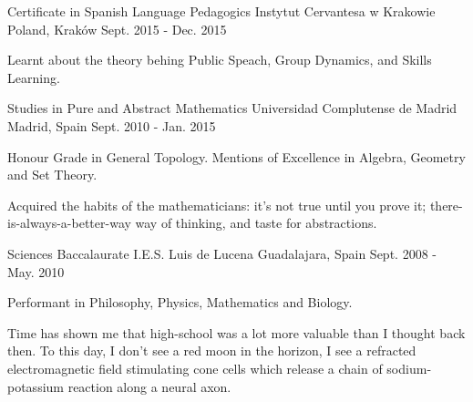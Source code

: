 

\begin{cventries}

  \cventry
    {Certificate in Spanish Language Pedagogics} %
    {Instytut Cervantesa w Krakowie} %
    {Poland, Kraków} %
    {Sept. 2015 - Dec. 2015} %
    {
      \begin{cvitems} %
        \item {Learnt about the theory behing Public Speach, Group Dynamics, and Skills Learning.}
      \end{cvitems}
    }

\cventry
	{Studies in Pure and Abstract Mathematics} %
	{Universidad Complutense de Madrid} %
	{Madrid, Spain} %
	{Sept. 2010 - Jan. 2015} %
	{
		\begin{cvitems} %
			\item {Honour Grade in General Topology. Mentions of Excellence in Algebra, Geometry and Set Theory.}
			\item {Acquired the habits of the mathematicians: it's not true until you prove it; there-is-always-a-better-way way of thinking, and taste for abstractions.}
		\end{cvitems}
	}

\cventry
	{Sciences Baccalaurate} %
	{I.E.S. Luis de Lucena} %
	{Guadalajara, Spain} %
	{Sept. 2008 - May. 2010} %
	{
		\begin{cvitems} %
			\item {Performant in Philosophy, Physics, Mathematics and Biology.}
			\item {Time has shown me that high-school was a lot more valuable than I thought back then. To this day, I don't see a red moon in the horizon, I see a refracted electromagnetic field stimulating cone cells which release a chain of sodium-potassium reaction along a neural axon.}
		\end{cvitems}
	}

\end{cventries}
